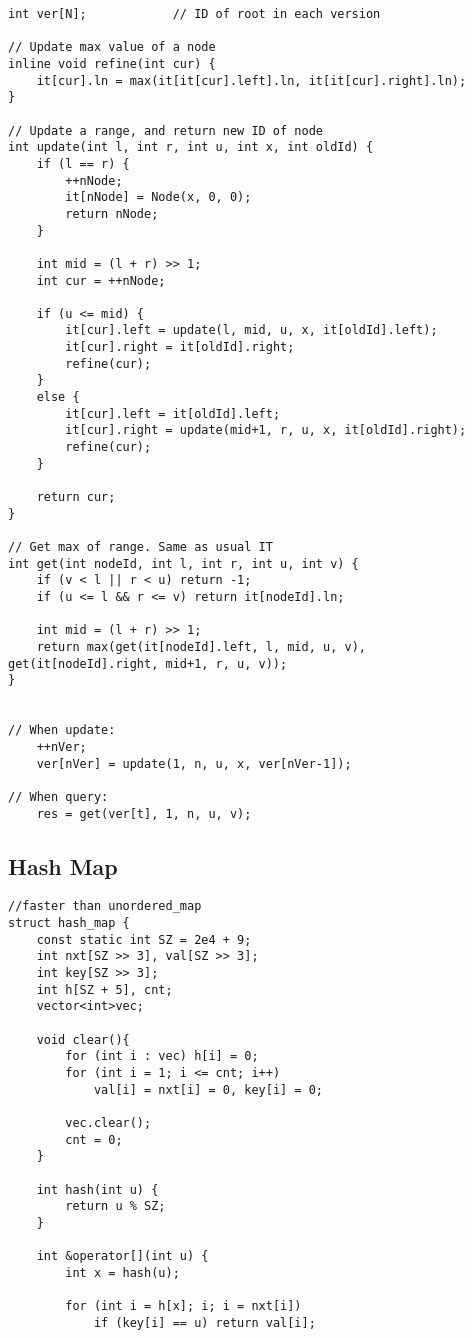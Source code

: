 \documentclass[11pt,a4paper]{article}
\begin{document}
\begin{multicols*}{2}
\begin{lstlisting}
int ver[N];            // ID of root in each version

// Update max value of a node
inline void refine(int cur) {
    it[cur].ln = max(it[it[cur].left].ln, it[it[cur].right].ln);
}

// Update a range, and return new ID of node
int update(int l, int r, int u, int x, int oldId) {
    if (l == r) {
        ++nNode;
        it[nNode] = Node(x, 0, 0);
        return nNode;
    }

    int mid = (l + r) >> 1;
    int cur = ++nNode;

    if (u <= mid) {
        it[cur].left = update(l, mid, u, x, it[oldId].left);
        it[cur].right = it[oldId].right;
        refine(cur);
    }
    else {
        it[cur].left = it[oldId].left;
        it[cur].right = update(mid+1, r, u, x, it[oldId].right);
        refine(cur);
    }

    return cur;
}

// Get max of range. Same as usual IT
int get(int nodeId, int l, int r, int u, int v) {
    if (v < l || r < u) return -1;
    if (u <= l && r <= v) return it[nodeId].ln;

    int mid = (l + r) >> 1;
    return max(get(it[nodeId].left, l, mid, u, v), get(it[nodeId].right, mid+1, r, u, v));
}


// When update:
    ++nVer;
    ver[nVer] = update(1, n, u, x, ver[nVer-1]);

// When query:
    res = get(ver[t], 1, n, u, v);
\end{lstlisting}

\subsection{Hash Map}
\begin{lstlisting}
//faster than unordered_map
struct hash_map {
    const static int SZ = 2e4 + 9;
    int nxt[SZ >> 3], val[SZ >> 3];
    int key[SZ >> 3];
    int h[SZ + 5], cnt;
    vector<int>vec;
    
    void clear(){
        for (int i : vec) h[i] = 0;
        for (int i = 1; i <= cnt; i++)
            val[i] = nxt[i] = 0, key[i] = 0;
 
        vec.clear();
        cnt = 0;
    }
    
    int hash(int u) {
        return u % SZ;
    }
    
    int &operator[](int u) {
        int x = hash(u);
 
        for (int i = h[x]; i; i = nxt[i])
            if (key[i] == u) return val[i];
 

\end{lstlisting}
\end{multicols*}
\end{document}
